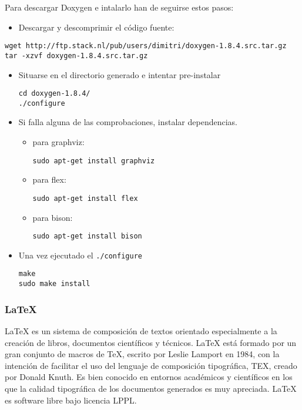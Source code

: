 Para descargar Doxygen e intalarlo han de seguirse estos pasos:
\begin{itemize}
  \item Descargar y descomprimir el código fuente:
\end{itemize}
\begin{lstlisting}[numbers=none]
wget http://ftp.stack.nl/pub/users/dimitri/doxygen-1.8.4.src.tar.gz
tar -xzvf doxygen-1.8.4.src.tar.gz
\end{lstlisting}
\begin{itemize}
  \item Situarse en el directorio generado e intentar pre-instalar
    \begin{lstlisting}[numbers=none]
cd doxygen-1.8.4/
./configure
    \end{lstlisting}
  \item Si falla alguna de las comprobaciones, instalar dependencias.
    \begin{itemize}
      \item para graphviz:
        \begin{lstlisting}[numbers=none]
sudo apt-get install graphviz
        \end{lstlisting}
      \item para flex:
        \begin{lstlisting}[numbers=none]
sudo apt-get install flex
        \end{lstlisting}
      \item para bison:
        \begin{lstlisting}[numbers=none]
sudo apt-get install bison
        \end{lstlisting}
    \end{itemize}
  \item Una vez ejecutado el \texttt{./configure}
    \begin{lstlisting}[numbers=none]
make
sudo make install
    \end{lstlisting}
\end{itemize}

\subsubsection{LaTeX}
LaTeX \cite{Web:LATEX} es un sistema de composición de textos orientado
especialmente a la creación de libros, documentos científicos y técnicos.
LaTeX está formado por un gran conjunto de macros de TeX, escrito por Leslie
Lamport en 1984, con la intención de facilitar el uso del lenguaje de
composición tipográfica, TEX, creado por Donald Knuth. 
Es bien conocido en entornos académicos y científicos en los que 
la calidad tipográfica de los documentos generados es muy apreciada.
LaTeX es software libre bajo licencia LPPL.

